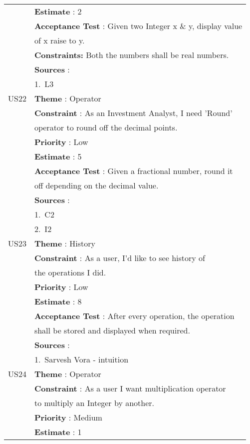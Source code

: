 \documentclass{article}
\begin{document}
\begin{longtable}{|| c || l ||}
         & \textbf{Estimate} : 2 \\
         & \textbf{Acceptance Test} : Given two Integer x \& y, display value\\
         & of x raise to y.\\
         & \textbf{Constraints: } Both the numbers shall be real numbers.\\
         & \textbf{Sources} : \\
         & 1.~L3 \\
         \hline
         US22 & \textbf{Theme} : Operator \\
         & \textbf{Constraint} : As an Investment Analyst, I need 'Round' \\
         & operator to round off the decimal points.\\
         & \textbf{Priority} : Low \\
         & \textbf{Estimate} : 5 \\
         & \textbf{Acceptance Test} : Given a fractional number, round it \\
         & off depending on the decimal value.\\
         & \textbf{Sources} : \\
         & 1.~C2 \\
         & 2.~I2 \\
         \hline
         US23 & \textbf{Theme} : History \\
         & \textbf{Constraint} : As a user, I'd like to see history of \\
         & the operations I did.\\
         & \textbf{Priority} : Low \\
         & \textbf{Estimate} : 8 \\
         & \textbf{Acceptance Test} : After every operation, the operation \\
         & shall be stored and displayed when required.\\
         & \textbf{Sources} : \\
         & 1.~Sarvesh Vora - intuition \\
         \hline
         US24 & \textbf{Theme} : Operator \\
         & \textbf{Constraint} : As a user I want multiplication operator \\
         & to multiply an Integer by another.\\
         & \textbf{Priority} : Medium \\
         & \textbf{Estimate} : 1 \\

\end{longtable}
\end{document}
